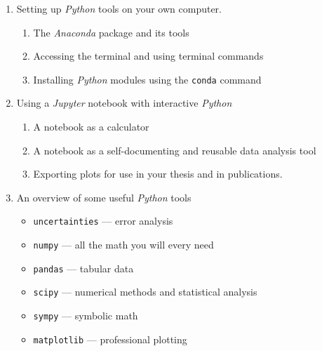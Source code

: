 \documentclass{tufte-handout}
\begin{document}
\begin{enumerate}

\item Setting up \textit{Python} tools on your own computer. 

\begin{enumerate}

\item The \textit{Anaconda} package and its tools

\item Accessing the terminal and using terminal commands

\item Installing \textit{Python} modules using the \texttt{conda} command

\end{enumerate}

\item Using a \textit{Jupyter} notebook with interactive \textit{Python}

\begin{enumerate}

\item A notebook as a calculator

\item A notebook as a self-documenting and reusable data analysis tool

\item Exporting plots for use in your thesis and in publications.

\end{enumerate}

\item An overview of some useful \textit{Python} tools

\begin{itemize}
\item \texttt{uncertainties} --- error analysis
\item \texttt{numpy} --- all the math you will every need
\item \texttt{pandas} --- tabular data
\item \texttt{scipy} --- numerical methods and statistical analysis
\item \texttt{sympy} --- symbolic math
\item \texttt{matplotlib} --- professional plotting

\end{itemize}

\end{enumerate}



\nobibliography{}
\end{document}
